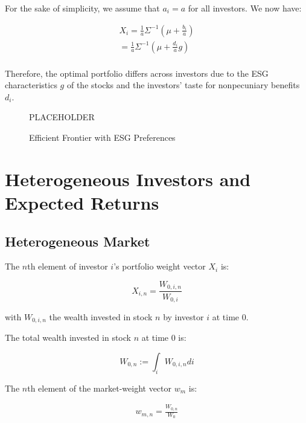 For the sake of simplicity, we assume that $a_i = a$ for all investors.
We now have:

\begin{equation}
    \begin{aligned}
    X_i = \frac{1}{a} \Sigma^{-1}(\mu + \frac{b_i}{a}) \\
    = \frac{1}{a} \Sigma^{-1}(\mu + \frac{d_i}{a}g) \\
    \end{aligned}
\end{equation}

Therefore, the optimal portfolio differs across investors due to the
ESG characteristics $g$ of the stocks and the investors' taste for
nonpecuniary benefits $d_i$. 


\begin{figure}
    \centering
    PLACEHOLDER
    \caption{Efficient Frontier with ESG Preferences}
    \label{fig:esg_taste}
\end{figure}

\section{Heterogeneous Investors and Expected Returns}


\subsection{Heterogeneous Market}

The $n$th element of investor $i$'s portfolio weight vector $X_i$ is:

\begin{equation}
    X_{i,n} = \frac{W_{0,i,n}}{W_{0,i}}
\end{equation}

with $W_{0,i,n}$ the wealth invested in stock $n$ by investor $i$ at time 0.

The total wealth invested in stock $n$ at time 0 is:

\begin{equation}
    W_{0,n} := \int_i W_{0,i,n} di
\end{equation}

The $n$th element of the market-weight vector $w_m$ is:

\begin{equation}
    \begin{aligned}
    w_{m,n} = \frac{W_{0,n}}{W_{0}} \\
    \end{aligned}
\end{equation}

